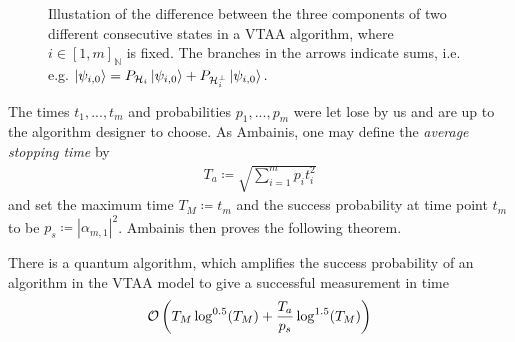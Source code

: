 \begin{figure}[!hbtp]
    \centering
    \caption{Illustation of the difference between the three components of two different consecutive states in a VTAA algorithm, where \(i \in [1, m]_{\mathbb{N}}\) is fixed. The branches in the arrows indicate sums, i.e. e.g. \(\ket{\psi_{i, 0}} = P_{\mathcal{H}_i}\ket{\psi_{i, 0}} + P_{\mathcal{H}_i^\perp}\ket{\psi_{i, 0}}.\)}
    \label{vtaa_illustration}
\end{figure}

The times \(t_1, ..., t_m\) and probabilities \(p_1, ..., p_m\) were let lose by us and are up to the algorithm designer to choose. As Ambainis, one may define the \emph{average stopping time} by
\begin{align}
    T_a \coloneqq \sqrt{\sum_{i=1}^m p_i t_i^2}
\end{align}
and set the maximum time \(T_M \coloneqq t_m\) and the success probability at time point \(t_m\) to be \(p_s \coloneqq |\alpha_{m, 1}|^2\). Ambainis then proves the following theorem.

\begin{theorem}
    There is a quantum algorithm, which amplifies the success probability of an algorithm in the VTAA model to give a successful measurement in time
    \begin{align}
        \operatorname{\mathcal{O}}\left(T_M\log^{0.5}(T_M)+\frac{T_a}{p_s}\log^{1.5}(T_M)\right)
    \end{align}
\end{theorem}

